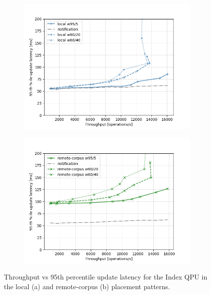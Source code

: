 \begin{figure}[H]
  \begin{subfigure}{0.5\textwidth}
    \includegraphics[width=\linewidth]{./figures/evaluation/ycsb_update_latency_local.png}
    \caption{}
    \label{fig:ycsb_update_latency_local}
  \end{subfigure}%
  \hspace*{\fill}
  \begin{subfigure}{0.5\textwidth}
    \includegraphics[width=\linewidth]{./figures/evaluation/ycsb_update_latency_remote.png}
    \caption{}
    \label{fig:ycsb_update_latency_remote}
  \end{subfigure}%
  \caption{Throughput vs 95th percentile update latency for the Index QPU in the local (a) and remote-corpus (b) placement patterns.}
  \label{fig:ycsb_update_latency_local_local_remote}
\end{figure}

